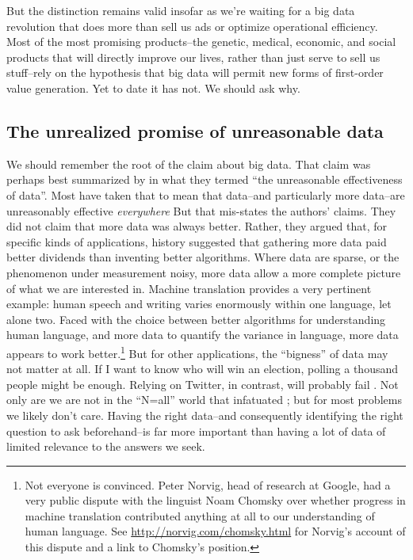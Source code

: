 \documentclass[12pt]{article}
\begin{document}
But the distinction remains valid insofar as we're waiting for a big
data revolution that does more than sell us ads or optimize
operational efficiency. Most of the most promising products--the
genetic, medical, economic, and social products that will directly
improve our lives, rather than just serve to sell us stuff--rely on
the hypothesis that big data will permit new forms of first-order
value generation. Yet to date it has not. We should ask why. 

\subsection{The unrealized promise of unreasonable data}
\label{sec:unre-prom-unre}

We should remember the root of the claim about big data. That claim
was perhaps best summarized by \cite{halevy2009unreasonable} in what
they termed ``the unreasonable effectiveness of data''. Most have
taken that to mean that data--and particularly more data--are
unreasonably effective \textit{everywhere} But that mis-states the authors'
claims. They did not claim that more data was always better. Rather,
they argued that, for specific kinds
of applications, history suggested that gathering more data paid better
dividends than inventing better algorithms. Where data are sparse, or
the phenomenon under measurement noisy, more data allow a more
complete picture of what we are interested in. Machine translation
provides a very pertinent example: human speech and writing varies
enormously within one language, let alone two. Faced with the choice
between better algorithms for understanding human language, and more
data to quantify the variance in language, more data appears to work
better.\footnote{Not everyone is convinced. Peter Norvig, head of
  research at Google, had a very public dispute with the linguist Noam
Chomsky over whether progress in machine translation contributed
anything at all to our understanding of human language. See
\url{http://norvig.com/chomsky.html} for Norvig's account of this
dispute and a link to Chomsky's position.} But for other applications, the ``bigness'' of data may not matter at
all. If I want to know who will win an election, polling a thousand
people might be enough. Relying on Twitter, in contrast, will probably
fail \citep{gayo2011limits,gayo2012wanted,huberty2013}. Not only are we are not
in the ``N=all'' world that infatuated
\cite{mayer2013big}; but for most problems we likely don't
care. Having the right data--and consequently identifying the right
question to ask beforehand--is far more important than having a lot of
data of limited relevance to the answers we seek.
\end{document}
